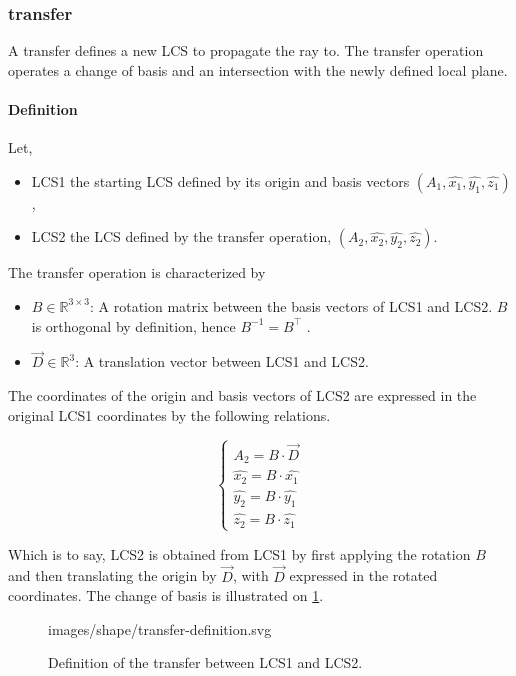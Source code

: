 \subsubsection{transfer} \label{sec:transfer}
A transfer defines a new \gls{LCS} to propagate the ray to.  The transfer
operation operates a change of basis and an intersection with the newly defined
local plane.

\paragraph{Definition}
Let,
\begin{itemize}
\item LCS1 the starting \gls{LCS} defined by its origin and basis vectors
$(A_1, \hat{x_1}, \hat{y_1}, \hat{z_1})$,
\item LCS2 the \gls{LCS} defined by the transfer operation, 
$(A_2, \hat{x_2}, \hat{y_2}, \hat{z_2})$.
\end{itemize}

The transfer operation is characterized by
\begin{itemize}
\item $B \in \mathbb{R}^{3 \times 3}$: A rotation matrix between the basis
vectors of LCS1 and LCS2. $B$ is orthogonal by definition,
hence $B^{-1} = B^\top$ \cite{wiki:rotation-matrix}.
\item $\overrightarrow{D} \in \mathbb{R}^3$: A translation vector between
LCS1 and LCS2.
\end{itemize}

The coordinates of the origin and basis vectors of LCS2 are expressed in
the original LCS1 coordinates by the following relations.

\begin{equation} \begin{cases}
A_2 = B \cdot \overrightarrow{D} \\
\hat{x_2} = B \cdot \hat{x_1} \\
\hat{y_2} = B \cdot \hat{y_1} \\
\hat{z_2} = B \cdot \hat{z_1}
\end{cases} \end{equation}

Which is to say, LCS2 is obtained from LCS1 by first applying the rotation $B$
and then translating the origin by $\overrightarrow{D}$, with
$\overrightarrow{D}$ expressed in the rotated coordinates. The change of basis
is illustrated on \cref{fig:transfer-definition}.

\begin{figure} \caption{\label{fig:transfer-definition}
Definition of the transfer between LCS1 and LCS2.}

           {images/shape/transfer-definition.svg}
\end{figure}


